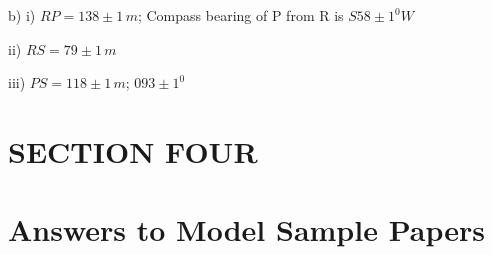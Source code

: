 \documentclass[
  a4paperpaper,
]{scrbook}
\begin{document}
\begin{tcolorbox}
\begin{enumerate}
  b) i) \(RP=138\pm1\,m\); Compass bearing of P from R is \(S58\pm1^0W\)

  ii) \(RS=79\pm1\,m\)

  iii) \(PS=118\pm1\,m\); \(093\pm1^0\)
\end{enumerate}

\subsection*{}\label{section}

\end{tcolorbox}


\chapter*{SECTION FOUR}\label{section-four}



\chapter*{Answers to Model Sample
Papers}\label{answers-to-model-sample-papers}

\end{document}
